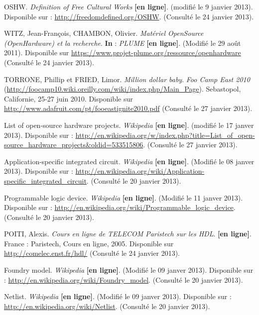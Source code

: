 \documentclass{report}
\begin{document}
\begin{thebibliography}{1}
OSHW. \textit{Definition of Free Cultural Works} \textbf{[en ligne]}. (modifié le 9 janvier 2013). Disponible sur : \url{http://freedomdefined.org/OSHW}. (Consulté le 24 janvier 2013).

WITZ, Jean-François, CHAMBON, Olivier. \textit{Matériel OpenSource (OpenHardware) et la recherche}. \textbf{In} : \textit{PLUME} \textbf{[en ligne]}. (Modifié le 29 août 2011). Disponible sur \url{https://www.projet-plume.org/ressource/openhardware} (Consulté le 24 janvier 2013).

TORRONE, Phillip et FRIED, Limor. \textit{Million dollar baby}. \textit{Foo Camp East 2010} (\url{http://foocamp10.wiki.oreilly.com/wiki/index.php/Main\_Page}). Sebastopol, Californie, 25-27 juin 2010. Disponible sur \url{http://www.adafruit.com/pt/fooeastignite2010.pdf} (Consulté le 27 janvier 2013).

List of open-source hardware projects. \textit{Wikipedia} \textbf{[en ligne]}. (modifié le 17 janver 2013). Disponible sur : \url{http://en.wikipedia.org/w/index.php?title=List\_of\_open-source\_hardware\_projects\&oldid=533515806}. (Consulté le 27 janvier 2013).



Application-specific integrated circuit. \textit{Wikipedia} \textbf{[en ligne]}. (Modifié le 08 janver 2013). Disponible sur : \url{http://en.wikipedia.org/wiki/Application-specific\_integrated\_circuit}. (Consulté le 20 janvier 2013).

Programmable logic device. \textit{Wikipedia} \textbf{[en ligne]}. (Modifié le 11 janver 2013). Disponible sur : \url{http://en.wikipedia.org/wiki/Programmable\_logic\_device}. (Consulté le 20 janvier 2013).

POITI, Alexis. \textit{Cours en ligne de {TELECOM} Paristech sur les {HDL}}. \textbf{[en ligne]}. France : Paristech, Cours en ligne, 2005. Disponible sur \url{http://comelec.enst.fr/hdl/} (Consulté le 24 janvier 2013).

Foundry model. \textit{Wikipedia} \textbf{[en ligne]}. (Modifié le 09 janver 2013). Disponible sur : \url{http://en.wikipedia.org/wiki/Foundry\_model}. (Consulté le 20 janvier 2013).

Netlist. \textit{Wikipedia} \textbf{[en ligne]}. (Modifié le 09 janver 2013). Disponible sur : \url{http://en.wikipedia.org/wiki/Netlist}. (Consulté le 20 janvier 2013).


\end{thebibliography}
\end{document}
